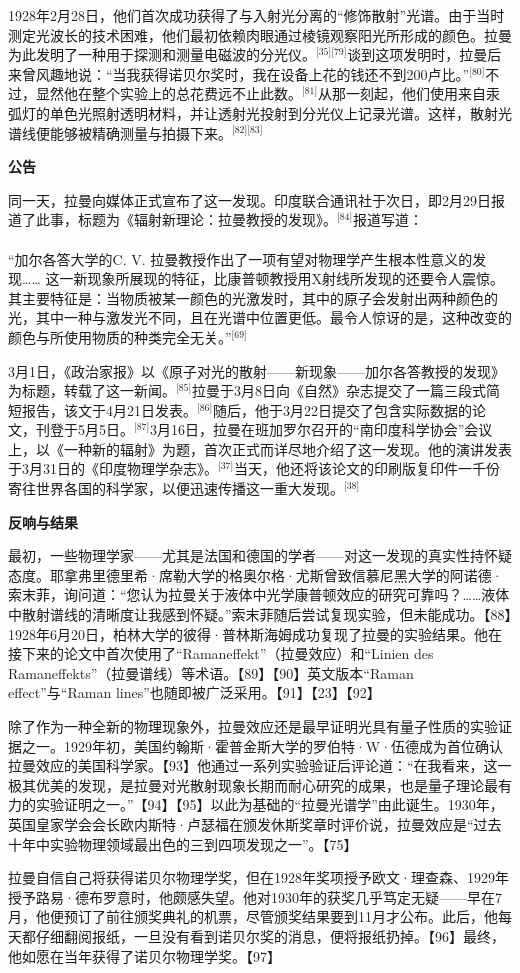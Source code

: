 1928年2月28日，他们首次成功获得了与入射光分离的“修饰散射”光谱。由于当时测定光波长的技术困难，他们最初依赖肉眼通过棱镜观察阳光所形成的颜色。拉曼为此发明了一种用于探测和测量电磁波的分光仪。\(^\text{[35][79]}\)谈到这项发明时，拉曼后来曾风趣地说：“当我获得诺贝尔奖时，我在设备上花的钱还不到200卢比。”\(^\text{[80]}\)不过，显然他在整个实验上的总花费远不止此数。\(^\text{[81]}\)从那一刻起，他们使用来自汞弧灯的单色光照射透明材料，并让透射光投射到分光仪上记录光谱。这样，散射光谱线便能够被精确测量与拍摄下来。\(^\text{[82][83]}\)

\textbf{公告}

同一天，拉曼向媒体正式宣布了这一发现。印度联合通讯社于次日，即2月29日报道了此事，标题为《辐射新理论：拉曼教授的发现》。\(^\text{[84]}\)报道写道：\\\\

“加尔各答大学的C. V. 拉曼教授作出了一项有望对物理学产生根本性意义的发现……
这一新现象所展现的特征，比康普顿教授用X射线所发现的还要令人震惊。其主要特征是：当物质被某一颜色的光激发时，其中的原子会发射出两种颜色的光，其中一种与激发光不同，且在光谱中位置更低。最令人惊讶的是，这种改变的颜色与所使用物质的种类完全无关。”\(^\text{[69]}\)

3月1日，《政治家报》以《原子对光的散射——新现象——加尔各答教授的发现》为标题，转载了这一新闻。\(^\text{[85]}\)拉曼于3月8日向《自然》杂志提交了一篇三段式简短报告，该文于4月21日发表。\(^\text{[86]}\)随后，他于3月22日提交了包含实际数据的论文，刊登于5月5日。\(^\text{[87]}\)3月16日，拉曼在班加罗尔召开的“南印度科学协会”会议上，以《一种新的辐射》为题，首次正式而详尽地介绍了这一发现。他的演讲发表于3月31日的《印度物理学杂志》。\(^\text{[37]}\)当天，他还将该论文的印刷版复印件一千份寄往世界各国的科学家，以便迅速传播这一重大发现。\(^\text{[38]}\)

\textbf{反响与结果}

最初，一些物理学家——尤其是法国和德国的学者——对这一发现的真实性持怀疑态度。耶拿弗里德里希·席勒大学的格奥尔格·尤斯曾致信慕尼黑大学的阿诺德·索末菲，询问道：“您认为拉曼关于液体中光学康普顿效应的研究可靠吗？……液体中散射谱线的清晰度让我感到怀疑。”索末菲随后尝试复现实验，但未能成功。【88】1928年6月20日，柏林大学的彼得·普林斯海姆成功复现了拉曼的实验结果。他在接下来的论文中首次使用了“Ramaneffekt”（拉曼效应）和“Linien des Ramaneffekts”（拉曼谱线）等术语。【89】【90】英文版本“Raman effect”与“Raman lines”也随即被广泛采用。【91】【23】【92】

除了作为一种全新的物理现象外，拉曼效应还是最早证明光具有量子性质的实验证据之一。1929年初，美国约翰斯·霍普金斯大学的罗伯特·W·伍德成为首位确认拉曼效应的美国科学家。【93】他通过一系列实验验证后评论道：“在我看来，这一极其优美的发现，是拉曼对光散射现象长期而耐心研究的成果，也是量子理论最有力的实验证明之一。”【94】【95】以此为基础的“拉曼光谱学”由此诞生。1930年，英国皇家学会会长欧内斯特·卢瑟福在颁发休斯奖章时评价说，拉曼效应是“过去十年中实验物理领域最出色的三到四项发现之一”。【75】

拉曼自信自己将获得诺贝尔物理学奖，但在1928年奖项授予欧文·理查森、1929年授予路易·德布罗意时，他颇感失望。他对1930年的获奖几乎笃定无疑——早在7月，他便预订了前往颁奖典礼的机票，尽管颁奖结果要到11月才公布。此后，他每天都仔细翻阅报纸，一旦没有看到诺贝尔奖的消息，便将报纸扔掉。【96】最终，他如愿在当年获得了诺贝尔物理学奖。【97】
